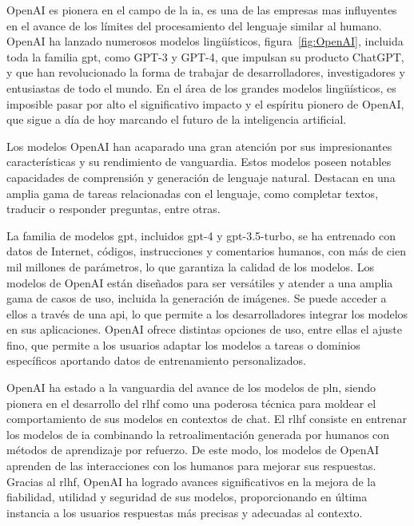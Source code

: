 OpenAI es pionera en el campo de la \acrlong{ia}, es una de las empresas mas influyentes en el avance de los límites del procesamiento del lenguaje similar al humano. OpenAI ha lanzado numerosos modelos lingüísticos, figura~\ref{fig:OpenAI}, incluida toda la familia \acrshort{gpt}, como GPT-3 y GPT-4, que impulsan su producto ChatGPT, y que han revolucionado la forma de trabajar de desarrolladores, investigadores y entusiastas de todo el mundo. En el área de los grandes modelos lingüísticos, es imposible pasar por alto el significativo impacto y el espíritu pionero de OpenAI, que sigue a día de hoy marcando el futuro de la inteligencia artificial.

Los modelos OpenAI han acaparado una gran atención por sus impresionantes características y su rendimiento de vanguardia. Estos modelos poseen notables capacidades de comprensión y generación de lenguaje natural. Destacan en una amplia gama de tareas relacionadas con el lenguaje, como completar textos, traducir o responder preguntas, entre otras.

La familia de modelos \acrshort{gpt}, incluidos gpt-4 y gpt-3.5-turbo, se ha entrenado con datos de Internet, códigos, instrucciones y comentarios humanos, con más de cien mil millones de parámetros, lo que garantiza la calidad de los modelos. Los modelos de OpenAI están diseñados para ser versátiles y atender a una amplia gama de casos de uso, incluida la generación de imágenes. Se puede acceder a ellos a través de una \acrshort{api}, lo que permite a los desarrolladores integrar los modelos en sus aplicaciones. OpenAI ofrece distintas opciones de uso, entre ellas el ajuste fino, que permite a los usuarios adaptar los modelos a tareas o dominios específicos aportando datos de entrenamiento personalizados.


OpenAI ha estado a la vanguardia del avance de los modelos de \acrfull{pln}, siendo pionera en el desarrollo del \acrfull{rlhf} como una poderosa técnica para moldear el comportamiento de sus modelos en contextos de chat. El \acrshort{rlhf} consiste en entrenar los modelos de \acrshort{ia} combinando la retroalimentación generada por humanos con métodos de aprendizaje por refuerzo. De este modo, los modelos de OpenAI aprenden de las interacciones con los humanos para mejorar sus respuestas. Gracias al \acrshort{rlhf}, OpenAI ha logrado avances significativos en la mejora de la fiabilidad, utilidad y seguridad de sus modelos, proporcionando en última instancia a los usuarios respuestas más precisas y adecuadas al contexto.

